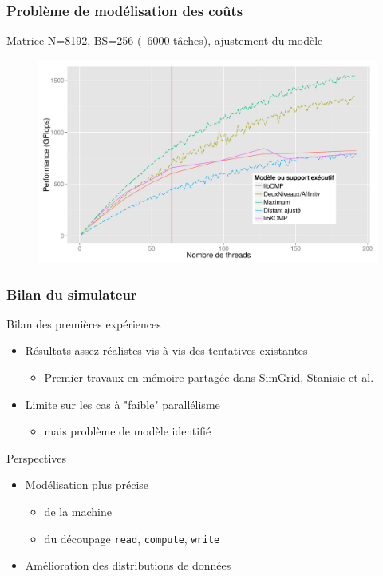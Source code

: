 \documentclass[xcolor={usenames,dvipsnames,svgnames,table}, aspectratio=43]{beamer}
\begin{document}
\begin{frame}
  \frametitle{Problème de modélisation des coûts}
  Matrice N=8192, BS=256 (~6000 tâches), ajustement du modèle
  \begin{figure}
    \includegraphics[width=\textwidth]{graph/simu_affinity_8k_runtime_idchire_ajuste.pdf}%
  \end{figure}


\end{frame}



\begin{frame}[fragile]
  \frametitle{Bilan du simulateur}

  \begin{block}{Bilan des premières expériences}
    \begin{itemize}
      \item Résultats assez réalistes vis à vis des tentatives existantes
      \begin{itemize}
	\item Premier travaux en mémoire partagée dans SimGrid, Stanisic et al.
      \end{itemize}
      \item Limite sur les cas à "faible" parallélisme
      \begin{itemize}
	  \item mais problème de modèle identifié
      \end{itemize}
    \end{itemize}
  \end{block}
  \begin{block}{Perspectives}
    \begin{itemize}
      \item Modélisation plus précise
      \begin{itemize}
	\item de la machine
	\item du découpage \verb/read/, \verb/compute/, \verb/write/
      \end{itemize}
      \item Amélioration des distributions de données
    \end{itemize}
  \end{block}
\end{frame}
\end{document}
